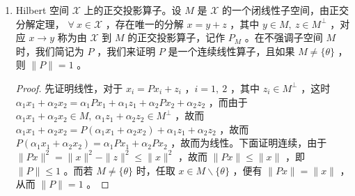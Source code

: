 \begin{enumerate}[leftmargin=2cm, label=\arabic*]
\begin{proof}
\end{proof}
    \item Hilbert 空间 $\mathscr{X}$ 上的正交投影算子。设 $M$ 是 $\mathscr{X}$ 的一个闭线性子空间，由正交分解定理， $\forall\ x\in\mathscr{X}$ ，存在唯一的分解 $x = y + z$ ，其中 $y\in M,\ z\in M^{\perp}$ ，对应 $x\to y$ 称为由 $\mathscr{X}$ 到 $M$ 的正交投影算子，记作 $P_M$ 。在不强调子空间 $M$ 时，我们简记为 $P$ ，我们来证明 $P$ 是一个连续线性算子，且如果 $M\neq \{\theta\}$ ，则 $\|P\| = 1$ 。
\begin{proof}
    先证明线性，对于 $x_i = Px_i + z_i$ ，$i = 1,\ 2$ ，其中 $z_i \in M^{\perp}$ ，这时 $\alpha_1 x_1 + \alpha_2 x_2 = \alpha_1 Px_1 + \alpha_1 z_1 + \alpha_2 Px_2 + \alpha_2 z_2$ ，而由于 $\alpha_1x_1 + \alpha_2x_2\in M,\ \alpha_1z_1 + \alpha_2z_2\in M^{\perp}$ ，故而 $\alpha_1 x_1 + \alpha_2 x_2 = P(\alpha_1 x_1 + \alpha_2 x_2) + \alpha_1z_1 + \alpha_2z_2$ ，故而 $P(\alpha_1x_1 + \alpha_2x_2) = \alpha_1 P x_1 + \alpha_2 P x_2$ ，故而为线性。下面证明连续，由于 $\|Px\|^2 = \|x\|^2 - \|z\|^2 \leqslant \|x\|^2$ ，故而 $\|Px\| \leqslant \|x\|$ ，即 $\|P\| \leqslant 1$ 。而若 $M \neq \{\theta\}$ 时，任取 $x\in M\backslash\{\theta\}$ ，便有 $\|Px\| = \|x\|$ ，从而 $\|P\| = 1$ 。
\end{proof}
\end{enumerate}

